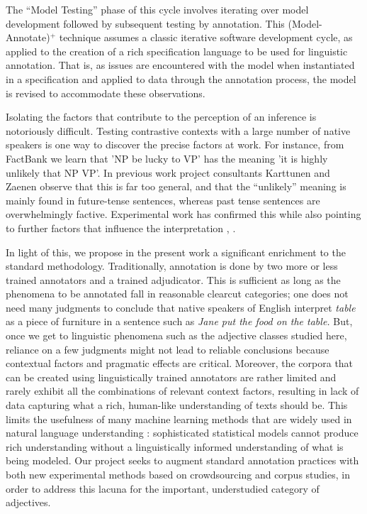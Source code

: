 \documentclass[10pt]{article}
\begin{document}
The ``Model Testing'' phase of this cycle involves iterating over model development followed by subsequent testing by annotation. This (Model-Annotate)$^+$ technique assumes a classic iterative software development cycle, as applied to the creation of a rich specification language to be used for linguistic annotation.  That is, as issues are encountered with the model when instantiated in a specification and applied to data through the annotation process, the model is revised to accommodate these observations. 


Isolating the factors that contribute to the perception of an inference is  notoriously difficult. Testing contrastive contexts with a large number of native speakers is one way to discover the precise factors at work.
For instance, from FactBank we learn that 'NP be lucky to VP' has the meaning 'it is highly unlikely that NP VP'. In previous work project consultants Karttunen and Zaenen \cite{karttunen:2012b,zaenen+karttunen:2013} observe that this is far too general, and that the ``unlikely'' meaning is mainly found in future-tense sentences, whereas past tense sentences are overwhelmingly factive. Experimental work has confirmed this while also pointing to further factors that influence the interpretation \cite{Peters et al}, \cite{karttunen2014}.

\medskip
In  light of this, we propose in the present work a significant enrichment to the standard methodology. Traditionally, annotation is done by two more or less trained annotators and a trained adjudicator. This is sufficient as long as the phenomena to be annotated fall in reasonable clearcut categories; one does not need many judgments to conclude that native speakers of English interpret \emph{table} as a piece of furniture in a sentence such as \emph{Jane put the food on the table.} But, once we get to 
linguistic phenomena such as the adjective classes studied here, reliance on a few judgments might not lead to reliable conclusions because contextual factors and pragmatic effects are critical.  
Moreover, the corpora that can be created using linguistically trained annotators are rather limited and rarely exhibit all the combinations of relevant context factors, resulting in lack of data capturing what a rich, human-like understanding of texts should be. This limits the usefulness of many machine learning methods that are widely used in natural language understanding \cite{manning1999foundations,wasserman2004all,murphy2012machine}: sophisticated statistical models cannot produce rich understanding without a linguistically informed understanding of what is being modeled. Our project seeks to augment standard annotation practices with both new experimental methods based on crowdsourcing and corpus studies, in order to address this lacuna for the important, understudied category of adjectives.
\end{document}
